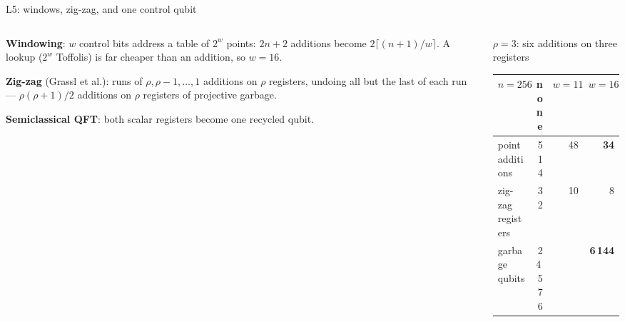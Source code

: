 \documentclass[aspectratio=169,11pt]{beamer}
\begin{document}
\setcounter{framenumber}{95}
\begin{frame}{L5: windows, zig-zag, and one control qubit}
  \begin{columns}[T]
    \begin{column}{0.5\textwidth}
      \small
      \textbf{Windowing}: $w$ control bits address a table of $2^w$ points: $2n+2$ additions become $2\lceil(n+1)/w\rceil$. A lookup ($2^w$ Toffolis) is far cheaper than an addition, so $w=16$.\par\vskip1mm
      \textbf{Zig-zag} (Grassl et al.): runs of $\rho,\rho-1,\dots,1$ additions on $\rho$ registers, undoing all but the last of each run --- $\rho(\rho+1)/2$ additions on $\rho$ registers of projective garbage.\par\vskip1mm
      \textbf{Semiclassical QFT}: both scalar registers become one recycled qubit.
    \end{column}
    \begin{column}{0.46\textwidth}
      \centering
      \par
      {\scriptsize $\rho=3$: six additions on three registers}
      \vskip1mm
      \footnotesize
      \renewcommand{\arraystretch}{1.08}
      \begin{tabular}{@{}lrrr@{}}
        \toprule
        $n=256$ & none & $w=11$ & $w=16$ \\
        \midrule
        point additions & 514 & 48 & \textbf{34} \\
        zig-zag registers & 32 & 10 & 8 \\
        garbage qubits & 24\,576 & & \textbf{6\,144} \\
        \bottomrule
      \end{tabular}
    \end{column}
  \end{columns}
\end{frame}
\end{document}
